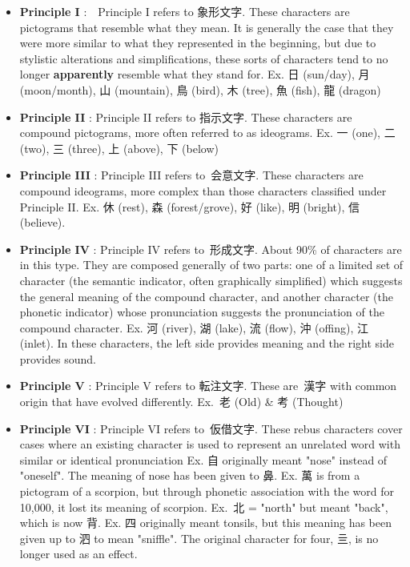 \begin{itemize}

\item \textbf{Principle I }:  Principle I refers to 象形文字. These characters are pictograms that resemble what they mean. It is generally the case that they were more similar to what they represented in the beginning, but due to stylistic alterations and simplifications, these sorts of characters tend to no longer \textbf{apparently }resemble what they stand for. \hfill\break
Ex. 日 (sun\slash day), 月 (moon\slash month), 山 (mountain), 鳥 (bird), 木 (tree), 魚 (fish), 龍 (dragon) 
\item \textbf{Principle II }: Principle II refers to 指示文字. These characters are compound pictograms, more often referred to as ideograms. \hfill\break
Ex. 一 (one), 二 (two), 三 (three), 上 (above), 下 (below) 
\item \textbf{Principle III }: Principle III refers to 会意文字. These characters are compound ideograms, more complex than those characters classified under Principle II. \hfill\break
Ex. 休 (rest), 森 (forest\slash grove), 好 (like), 明 (bright), 信 (believe). 
\item \textbf{Principle IV }: Principle IV refers to 形成文字. About 90\% of characters are in this type. They are composed generally of two parts: one of a limited set of character (the semantic indicator, often graphically simplified) which suggests the general meaning of the compound character, and another character (the phonetic indicator) whose pronunciation suggests the pronunciation of the compound character. \hfill\break
Ex. 河 (river), 湖 (lake), 流 (flow), 沖 (offing), 江 (inlet). In these characters, the left side provides meaning and the right side provides sound. 
\item \textbf{Principle V }: Principle V refers to 転注文字. These are 漢字 with common origin that have evolved differently. \hfill\break
Ex. 老 (Old) \& 考 (Thought) 
\item \textbf{Principle VI }: Principle VI refers to 仮借文字. These rebus characters cover cases where an existing character is used to represent an unrelated word with similar or identical pronunciation \hfill\break
Ex. 自 originally meant "nose" instead of "oneself". The meaning of nose has been given to 鼻. Ex. 萬 is from a pictogram of a scorpion, but through phonetic association with the word for 10,000, it lost its meaning of scorpion. \hfill\break
Ex. 北 = "north" but meant "back", which is now 背. \hfill\break
Ex. 四 originally meant tonsils, but this meaning has been given up to 泗 to mean "sniffle". The original character for four, 亖, is no longer used as an effect. 
\end{itemize}
      
